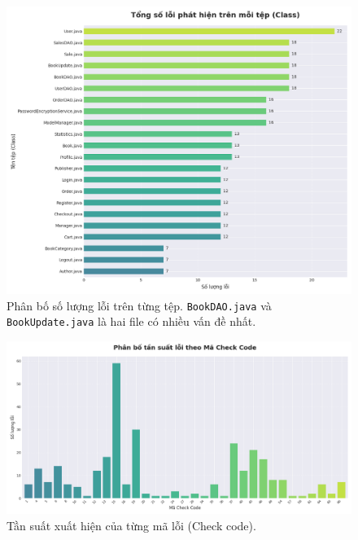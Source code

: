 \begin{figure}[htbp]
  \centering
  \includegraphics[width=1\textwidth]{images/bieu_do_loi_moi_tep.png}
  \caption{Phân bố số lượng lỗi trên từng tệp. \texttt{BookDAO.java} và \texttt{BookUpdate.java} là hai file có nhiều vấn đề nhất.}
  \label{fig:files_chart}
\end{figure}

\begin{figure}[htbp]
  \centering
  \includegraphics[width=1\textwidth]{images/bieu_do_phan_bo_loi.png}
  \caption{Tần suất xuất hiện của từng mã lỗi (Check code).}
  \label{fig:checkcode_chart}
\end{figure}

\newpage